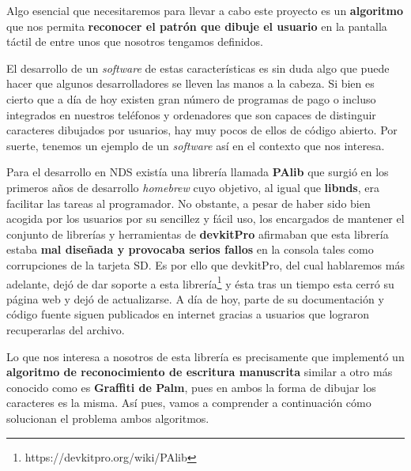 
Algo esencial que necesitaremos para llevar a cabo este proyecto es un \textbf{algoritmo} que nos permita \textbf{reconocer el patrón que dibuje el usuario} en la pantalla táctil de entre unos que nosotros tengamos definidos. 

\vspace{0.5cm}

El desarrollo de un \textit{software} de estas características es sin duda algo que puede hacer que algunos desarrolladores se lleven las manos a la cabeza. Si bien es cierto que a día de hoy existen gran número de programas de pago o incluso integrados en nuestros teléfonos y ordenadores que son capaces de distinguir caracteres dibujados por usuarios, hay muy pocos de ellos de código abierto. Por suerte, tenemos un ejemplo de un \textit{software} así en el contexto que nos interesa.

\vspace{0.5cm}

Para el desarrollo en NDS existía una librería llamada \textbf{PAlib} que surgió en los primeros años de desarrollo \textit{homebrew} cuyo objetivo, al igual que \textbf{libnds}, era facilitar las tareas al programador. No obstante, a pesar de haber sido bien acogida por los usuarios por su sencillez y fácil uso, los encargados de mantener el conjunto de librerías y herramientas de \textbf{devkitPro} afirmaban que esta librería estaba \textbf{mal diseñada y provocaba serios fallos} en la consola tales como corrupciones de la tarjeta SD. Es por ello que devkitPro, del cual hablaremos más adelante, dejó de dar soporte a esta librería\footnote{https://devkitpro.org/wiki/PAlib} y ésta tras un tiempo esta cerró su página web y dejó de actualizarse. A día de hoy, parte de su documentación y código fuente siguen publicados en internet gracias a usuarios que lograron recuperarlas del archivo.

\vspace{0.5cm}

Lo que nos interesa a nosotros de esta librería es precisamente que implementó un \textbf{algoritmo de reconocimiento de escritura manuscrita} similar a otro más conocido como es \textbf{Graffiti de Palm}, pues en ambos la forma de dibujar los caracteres es la misma. Así pues, vamos a comprender a continuación cómo solucionan el problema ambos algoritmos.


